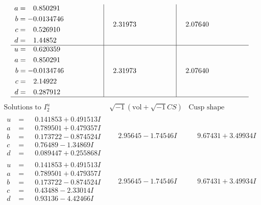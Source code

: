 \documentclass[1p]{elsarticle_modified}
\theoremstyle{definition}
\newcommand{\I}{\sqrt{-1}}
\begin{document}
$$\begin{array}{c|c|c}
\begin{aligned}
a &= \phantom{-}0.850291\phantom{ +0.000000I} \\
b &= -0.0134746\phantom{ +0.000000I} \\
c &= \phantom{-}0.526910\phantom{ +0.000000I} \\
d &= \phantom{-}1.44852\phantom{ +0.000000I}\end{aligned}
 & \phantom{-}2.31973\phantom{ +0.000000I} & \phantom{-}2.07640\phantom{ +0.000000I} \\ \hline\begin{aligned}
u &= \phantom{-}0.620359\phantom{ +0.000000I} \\
a &= \phantom{-}0.850291\phantom{ +0.000000I} \\
b &= -0.0134746\phantom{ +0.000000I} \\
c &= \phantom{-}2.14922\phantom{ +0.000000I} \\
d &= \phantom{-}0.287912\phantom{ +0.000000I}\end{aligned}
 & \phantom{-}2.31973\phantom{ +0.000000I} & \phantom{-}2.07640\phantom{ +0.000000I}\\
 \hline 
 \end{array}$$\newpage$$\begin{array}{c|c|c}  
\text{Solutions to }I^u_{2}& \I (\text{vol} + \sqrt{-1}CS) & \text{Cusp shape}\\
 \hline 
\begin{aligned}
u &= \phantom{-}0.141853 + 0.491513 I \\
a &= \phantom{-}0.789501 + 0.479357 I \\
b &= \phantom{-}0.173722 - 0.874524 I \\
c &= \phantom{-}0.76489 - 1.34869 I \\
d &= \phantom{-}0.089447 + 0.255868 I\end{aligned}
 & \phantom{-}2.95645 - 1.74546 I & \phantom{-}9.67431 + 3.49934 I \\ \hline\begin{aligned}
u &= \phantom{-}0.141853 + 0.491513 I \\
a &= \phantom{-}0.789501 + 0.479357 I \\
b &= \phantom{-}0.173722 - 0.874524 I \\
c &= \phantom{-}0.43488 - 2.33014 I \\
d &= \phantom{-}0.93136 - 4.42466 I\end{aligned}
 & \phantom{-}2.95645 - 1.74546 I & \phantom{-}9.67431 + 3.49934 I \\ \hline\begin{aligned}

\end{aligned}
\end{array}$$
\end{document}
